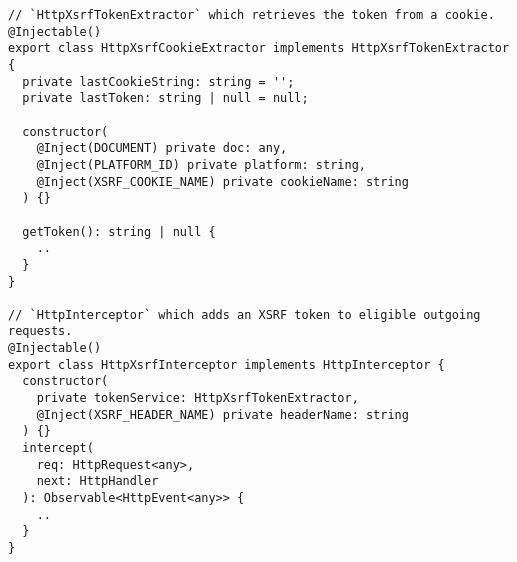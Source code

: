 \begin{verbatim}
// `HttpXsrfTokenExtractor` which retrieves the token from a cookie.
@Injectable()
export class HttpXsrfCookieExtractor implements HttpXsrfTokenExtractor {
  private lastCookieString: string = '';
  private lastToken: string | null = null;

  constructor(
    @Inject(DOCUMENT) private doc: any,
    @Inject(PLATFORM_ID) private platform: string,
    @Inject(XSRF_COOKIE_NAME) private cookieName: string
  ) {}

  getToken(): string | null {
    ..
  }
}

// `HttpInterceptor` which adds an XSRF token to eligible outgoing requests.
@Injectable()
export class HttpXsrfInterceptor implements HttpInterceptor {
  constructor(
    private tokenService: HttpXsrfTokenExtractor,
    @Inject(XSRF_HEADER_NAME) private headerName: string
  ) {}
  intercept(
    req: HttpRequest<any>,
    next: HttpHandler
  ): Observable<HttpEvent<any>> {
    ..
  }
}
\end{verbatim}
